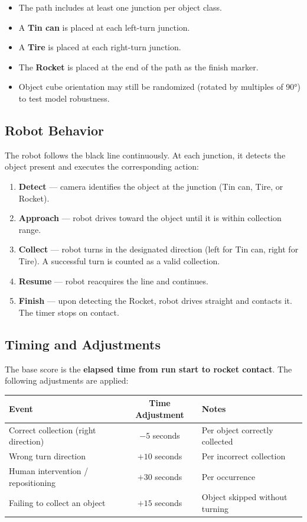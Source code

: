 \documentclass[11pt,a4paper]{article}
\begin{document}
\begin{itemize}
    \item The path includes at least one junction per object class.
    \item A \textbf{Tin can} is placed at each left-turn junction.
    \item A \textbf{Tire} is placed at each right-turn junction.
    \item The \textbf{Rocket} is placed at the end of the path as the finish marker.
    \item Object cube orientation may still be randomized (rotated by multiples of 90°) to test model robustness.
\end{itemize}

\subsection{Robot Behavior}

The robot follows the black line continuously. At each junction, it detects the object present and executes the corresponding action:

\begin{enumerate}
    \item \textbf{Detect} — camera identifies the object at the junction (Tin can, Tire, or Rocket).
    \item \textbf{Approach} — robot drives toward the object until it is within collection range.
    \item \textbf{Collect} — robot turns in the designated direction (left for Tin can, right for Tire). A successful turn is counted as a valid collection.
    \item \textbf{Resume} — robot reacquires the line and continues.
    \item \textbf{Finish} — upon detecting the Rocket, robot drives straight and contacts it. The timer stops on contact.
\end{enumerate}

\subsection{Timing and Adjustments}

The base score is the \textbf{elapsed time from run start to rocket contact}. The following adjustments are applied:

\begin{center}
\begin{tabular}{|l|c|l|}
\hline
\textbf{Event} & \textbf{Time Adjustment} & \textbf{Notes} \\
\hline
Correct collection (right direction)  & $-5$ seconds  & Per object correctly collected \\
Wrong turn direction                  & $+10$ seconds & Per incorrect collection \\
Human intervention / repositioning    & $+30$ seconds & Per occurrence \\
Failing to collect an object          & $+15$ seconds & Object skipped without turning \\
\hline
\end{tabular}
\end{center}
\end{document}
